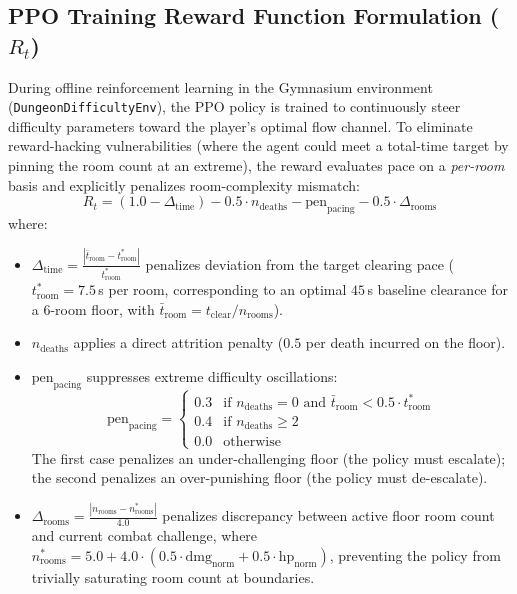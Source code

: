 \subsection{PPO Training Reward Function Formulation ($R_t$)}
During offline reinforcement learning in the Gymnasium environment (\texttt{Dungeon\-Difficulty\-Env}), the PPO policy is trained to continuously steer difficulty parameters toward the player's optimal flow channel. To eliminate reward-hacking vulnerabilities (where the agent could meet a total-time target by pinning the room count at an extreme), the reward evaluates pace on a \textit{per-room} basis and explicitly penalizes room-complexity mismatch:
\begin{equation}
R_t = (1.0 - \Delta_{\text{time}}) - 0.5 \cdot n_{\text{deaths}} - \text{pen}_{\text{pacing}} - 0.5 \cdot \Delta_{\text{rooms}}
\label{eq:reward_function}
\end{equation}
where:
\begin{itemize}
    \item $\Delta_{\text{time}} = \frac{|\bar{t}_{\text{room}} - t^*_{\text{room}}|}{t^*_{\text{room}}}$ penalizes deviation from the target clearing pace ($t^*_{\text{room}} = 7.5$\,s per room, corresponding to an optimal $45$\,s baseline clearance for a 6-room floor, with $\bar{t}_{\text{room}} = t_{\text{clear}} / n_{\text{rooms}}$).
    \item $n_{\text{deaths}}$ applies a direct attrition penalty ($0.5$ per death incurred on the floor).
    \item $\text{pen}_{\text{pacing}}$ suppresses extreme difficulty oscillations:
    \begin{equation}
    \text{pen}_{\text{pacing}} = \begin{cases}
    0.3 & \text{if } n_{\text{deaths}} = 0 \text{ and } \bar{t}_{\text{room}} < 0.5 \cdot t^*_{\text{room}} \\
    0.4 & \text{if } n_{\text{deaths}} \ge 2 \\
    0.0 & \text{otherwise}
    \end{cases}
    \end{equation}
    The first case penalizes an under-challenging floor (the policy must escalate); the second penalizes an over-punishing floor (the policy must de-escalate).
    \item $\Delta_{\text{rooms}} = \frac{|n_{\text{rooms}} - n^*_{\text{rooms}}|}{4.0}$ penalizes discrepancy between active floor room count and current combat challenge, where $n^*_{\text{rooms}} = 5.0 + 4.0 \cdot (0.5 \cdot \text{dmg}_{\text{norm}} + 0.5 \cdot \text{hp}_{\text{norm}})$, preventing the policy from trivially saturating room count at boundaries.
\end{itemize}

